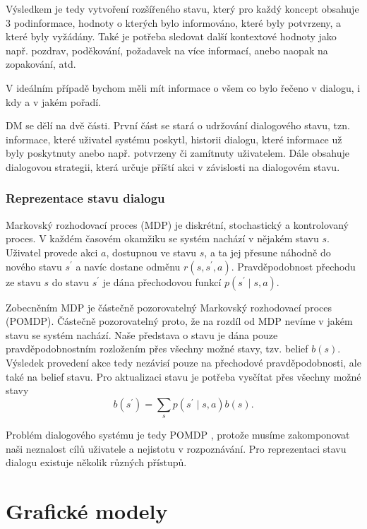 Výsledkem je tedy vytvoření rozšířeného stavu, který pro každý koncept obsahuje 3 podinformace, hodnoty o kterých bylo informováno, které byly potvrzeny, a které byly vyžádány.
Také je potřeba sledovat další kontextové hodnoty jako např. pozdrav, poděkování, požadavek na více informací, anebo naopak na zopakování, atd.

V ideálním případě bychom měli mít informace o všem co bylo řečeno v dialogu, i kdy a v jakém pořadí.

DM se dělí na dvě části. 
První část se stará o udržování dialogového stavu, tzn. informace, které uživatel systému poskytl, historii dialogu, které informace už byly poskytnuty anebo např. potvrzeny či zamítnuty uživatelem.
Dále obsahuje dialogovou strategii, která určuje příští akci v závislosti na dialogovém stavu.

\subsubsection{Reprezentace stavu dialogu}

Markovský rozhodovací proces (MDP) \cite{puterman2009markov} je diskrétní, stochastický a kontrolovaný proces. 
V každém časovém okamžiku se systém nachází v nějakém stavu $s$. 
Uživatel provede akci $a$, dostupnou ve stavu $s$, a ta jej přesune náhodně do nového stavu $s^\prime$ a navíc dostane odměnu $r(s, s^\prime, a)$.
Pravděpodobnost přechodu ze stavu $s$ do stavu $s^\prime$ je dána přechodovou funkcí $p(s^\prime \mid s, a)$.

Zobecněním MDP je částečně pozorovatelný Markovský rozhodovací proces (POMDP). 
Částečně pozorovatelný proto, že na rozdíl od MDP nevíme v jakém stavu se systém nachází.
Naše představa o stavu je dána pouze pravděpodobnostním rozložením přes všechny možné stavy, tzv. belief $b(s)$.
Výsledek provedení akce tedy nezávisí pouze na přechodové pravděpodobnosti, ale také na belief stavu. 
Pro aktualizaci stavu je potřeba vysčítat přes všechny možné stavy
\begin{equation}
b(s^\prime) = \sum_s p(s^\prime \mid s, a) b(s).
\end{equation}

Problém dialogového systému je tedy POMDP \cite{williams2007partially}, protože musíme zakomponovat naši neznalost cílů uživatele a nejistotu v rozpoznávání. 
Pro reprezentaci stavu dialogu existuje několik různých přístupů.

\section{Grafické modely}

